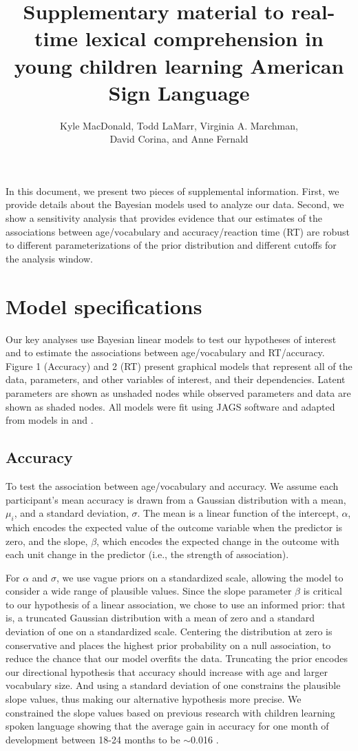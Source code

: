 \documentclass[a4paper]{article}
\title{Supplementary material to real-time lexical comprehension in young children learning American Sign Language}
\author{Kyle MacDonald, Todd LaMarr, Virginia A. Marchman,\\ David Corina, and Anne Fernald}
\date{}
\begin{document}
\maketitle

In this document, we present two pieces of supplemental information. First, we provide details about the Bayesian models used to analyze our data. Second, we show a sensitivity analysis that provides evidence that our estimates of the associations between age/vocabulary and accuracy/reaction time (RT) are robust to different parameterizations of the prior distribution and different cutoffs for the analysis window. 

\section{Model specifications}

Our key analyses use Bayesian linear models to test our hypotheses of interest and to estimate the associations between age/vocabulary and RT/accuracy. Figure 1 (Accuracy) and 2 (RT) present graphical models that represent all of the data, parameters, and other variables of interest, and their dependencies. Latent parameters are shown as unshaded nodes while observed parameters and data are shown as shaded nodes. All models were fit using JAGS software \cite{plummer2003jags} and adapted from models in  and .

\subsection{Accuracy}

To test the association between age/vocabulary and accuracy. We assume each participant's mean accuracy is drawn from a Gaussian distribution with a mean, $\mu_i$, and a standard deviation, $\sigma$. The mean is a linear function of the intercept, $\alpha$, which encodes the expected value of the outcome variable when the predictor is zero, and the slope, $\beta$, which encodes the expected change in the outcome with each unit change in the predictor (i.e., the strength of association). 

For $\alpha$ and $\sigma$, we use vague priors on a standardized scale, allowing the model to consider a wide range of plausible values. Since the slope parameter $\beta$ is critical to our hypothesis of a linear association, we chose to use an informed prior: that is, a truncated Gaussian distribution with a mean of zero and a standard deviation of one on a standardized scale. Centering the distribution at zero is conservative and places the highest prior probability on a null association, to reduce the chance that  our model overfits the data. Truncating the prior encodes our directional hypothesis that accuracy should increase with age and larger vocabulary size. And using a standard deviation of one constrains the plausible slope values, thus making our alternative hypothesis more precise. We constrained the slope values based on previous research with children learning spoken language showing that the average gain in accuracy for one month of development between 18-24 months to be $\sim$0.016 \cite{fernald2008looking}.
\end{document}
